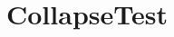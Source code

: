 \documentclass{book}
\begin{document}
\subsection{\cello}

\section{CollapseTest} \label{s:CollapseTest}

\subsection{\enzo}
\end{document}
